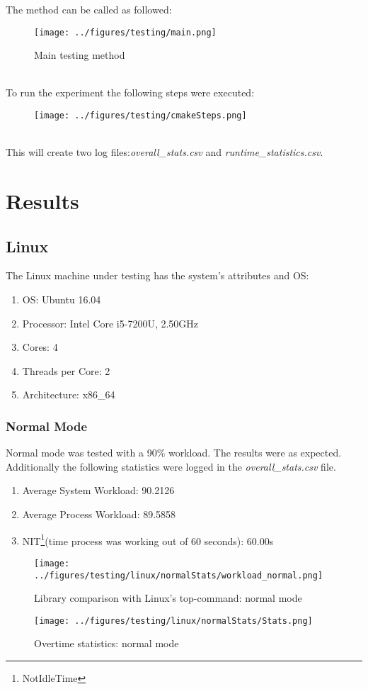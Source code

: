 The method can be called as followed:
\begin{figure}[!htbp]
	\texttt{[image: ../figures/testing/main.png]}
	\caption{Main testing method}
\end{figure}\\
To run the experiment the following steps were executed:\\
\begin{figure}[!htbp]
	\centering
	\texttt{[image: ../figures/testing/cmakeSteps.png]}
\end{figure}\\
This will create two log files:\textit{overall\_stats.csv} and \textit{runtime\_statistics.csv}.
\newpage
\section{Results}
\subsection{Linux}
The Linux machine under testing has the system's attributes and OS:
\begin{enumerate}
	\item OS: 				Ubuntu 16.04
	\item Processor: 		Intel Core i5-7200U, 2.50GHz
	\item Cores:			4
	\item Threads per Core:	2
	\item Architecture: 	x86\_64
\end{enumerate}
\subsubsection{Normal Mode}
Normal mode was tested with a 90\% workload. The results were as expected. Additionally the following statistics were logged in the \textit{overall\_stats.csv} file.
\begin{enumerate}
	\item Average System Workload: 90.2126
	\item Average Process Workload: 89.5858
	\item NIT\footnote{NotIdleTime}(time process was working out of 60 seconds): 60.00s 
\end{enumerate}  
\begin{figure}[!htbp]
	\centering
	\begin{minipage}[b]{\textwidth}
		\centering
		\texttt{[image: ../figures/testing/linux/normalStats/workload\_normal.png]}
		\caption{Library comparison with Linux's top-command: normal mode}
		\hspace{3mm}
	\end{minipage}
	\begin{minipage}[b]{\textwidth}
		\centering
		\texttt{[image: ../figures/testing/linux/normalStats/Stats.png]}
		\caption{Overtime statistics: normal mode}
	\end{minipage}
\end{figure}
\newpage
